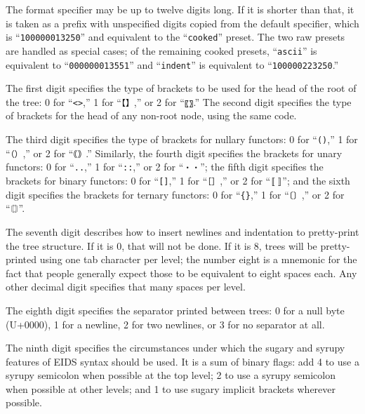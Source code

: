 \documentclass[twocolumn]{report}
\begin{document}
The format specifier may be up to twelve digits long.  If it is shorter than
that, it is taken as a prefix with unspecified digits copied from the
default specifier, which is ``\texttt{100000013250}'' and equivalent to the
``\texttt{cooked}'' preset.  The two raw presets are handled as special
cases; of the remaining cooked presets, ``\texttt{ascii}'' is equivalent to
``\texttt{000000013551}'' and ``\texttt{indent}'' is equivalent to
``\texttt{100000223250}.''

The first digit specifies the type of brackets to be used for the head of
the root of the tree: 0 for ``\texttt{<>},'' 1 for ``\texttt{【】},'' or 2
for ``\texttt{〖〗}.''  The second digit specifies the type of brackets for
the head of any non-root node, using the same code.

The third digit specifies the type of brackets for nullary functors:  0 for
``\texttt{()},'' 1 for ``\texttt{（）},'' or 2 for ``\texttt{｟｠}.''
Similarly, the fourth digit specifies the brackets for unary functors:
0 for ``\texttt{..},'' 1 for ``\texttt{::},'' or 2 for ``\texttt{・・}'';
the fifth digit specifies the brackets for binary functors:
0 for ``\texttt{[]},'' 1 for ``\texttt{［］},'' or 2 for ``\texttt{〚〛}'';
and the sixth digit specifies the brackets for ternary functors:
0 for ``\texttt{\{\}},'' 1 for ``\texttt{〔〕},'' or 2 for
``\texttt{〘〙}''.

The seventh digit describes how to insert newlines and indentation to
pretty-print the tree structure.  If it is 0, that will not be done.  If it
is 8, trees will be pretty-printed using one tab character per level; the
number eight is a mnemonic for the fact that people generally expect those
to be equivalent to eight spaces each.  Any other decimal digit specifies
that many spaces per level.

The eighth digit specifies the separator printed between trees: 0 for a null
byte (U+0000), 1 for a newline, 2 for two newlines, or 3 for no separator at
all.

The ninth digit specifies the circumstances under which the sugary and
syrupy features of EIDS syntax should be used.  It is a sum of binary flags:
add 4 to use a syrupy semicolon when possible at the top level;
2 to use a syrupy semicolon when possible at other levels;
and 1 to use sugary implicit brackets wherever possible.
\end{document}
